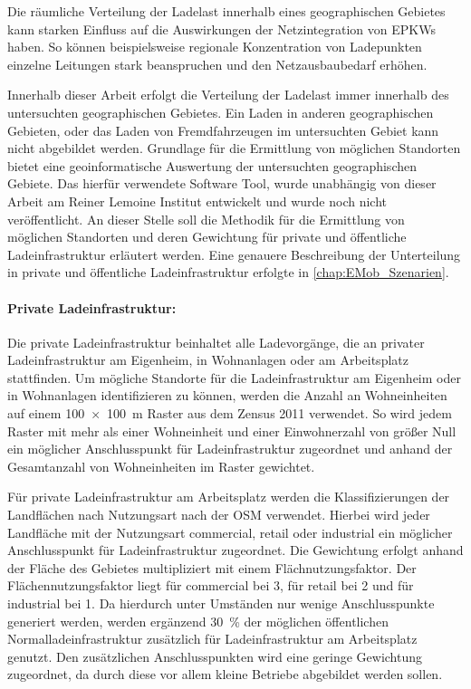 Die räumliche Verteilung der Ladelast innerhalb eines geographischen Gebietes kann starken Einfluss auf die Auswirkungen der Netzintegration von \glspl{EPKW} haben.
So können beispielsweise regionale Konzentration von Ladepunkten einzelne Leitungen stark beanspruchen und den Netzausbaubedarf erhöhen.\medskip

Innerhalb dieser Arbeit erfolgt die Verteilung der Ladelast immer innerhalb des untersuchten geographischen Gebietes.
Ein Laden in anderen geographischen Gebieten, oder das Laden von \glqq Fremdfahrzeugen\grqq{} im untersuchten Gebiet kann nicht abgebildet werden.
Grundlage für die Ermittlung von möglichen Standorten bietet eine geoinformatische Auswertung der untersuchten geographischen Gebiete.
Das hierfür verwendete Software Tool, wurde unabhängig von dieser Arbeit am Reiner Lemoine Institut entwickelt und wurde noch nicht veröffentlicht.
An dieser Stelle soll die Methodik für die Ermittlung von möglichen Standorten und deren Gewichtung für private und öffentliche Ladeinfrastruktur erläutert werden.
Eine genauere Beschreibung der Unterteilung in private und öffentliche Ladeinfrastruktur erfolgte in \autoref{chap:EMob_Szenarien}.


\paragraph{Private Ladeinfrastruktur:}

Die private Ladeinfrastruktur beinhaltet alle Ladevorgänge, die an privater Ladeinfrastruktur am Eigenheim, in Wohnanlagen oder am Arbeitsplatz stattfinden.
Um mögliche Standorte für die Ladeinfrastruktur am Eigenheim oder in Wohnanlagen identifizieren zu können, werden die Anzahl an Wohneinheiten auf einem \SI{100 x 100}{\m} Raster aus dem Zensus 2011 \cite{StatistischesBundesamt2011} verwendet.
So wird jedem Raster mit mehr als einer Wohneinheit und einer Einwohnerzahl von größer Null ein möglicher Anschlusspunkt für Ladeinfrastruktur zugeordnet und anhand der Gesamtanzahl von Wohneinheiten im Raster gewichtet.\medskip

Für private Ladeinfrastruktur am Arbeitsplatz werden die Klassifizierungen der Landflächen nach Nutzungsart nach der \gls{OSM} \cite{OpenStreetMapFoundation} verwendet.
Hierbei wird jeder Landfläche mit der Nutzungsart \glqq commercial\grqq , \glqq retail\grqq{} oder \glqq industrial\grqq{} ein möglicher Anschlusspunkt für Ladeinfrastruktur zugeordnet.
Die Gewichtung erfolgt anhand der Fläche des Gebietes multipliziert mit einem Flächnutzungsfaktor.
Der Flächennutzungsfaktor liegt für \glqq commercial\grqq{} bei \num{3}, für \glqq retail\grqq{} bei \num{2} und für \glqq industrial\grqq{} bei \num{1}.
Da hierdurch unter Umständen nur wenige Anschlusspunkte generiert werden, werden ergänzend \SI{30}{\percent} der möglichen öffentlichen Normalladeinfrastruktur zusätzlich für Ladeinfrastruktur am Arbeitsplatz genutzt.
Den zusätzlichen Anschlusspunkten wird eine geringe Gewichtung zugeordnet, da durch diese vor allem kleine Betriebe abgebildet werden sollen.


